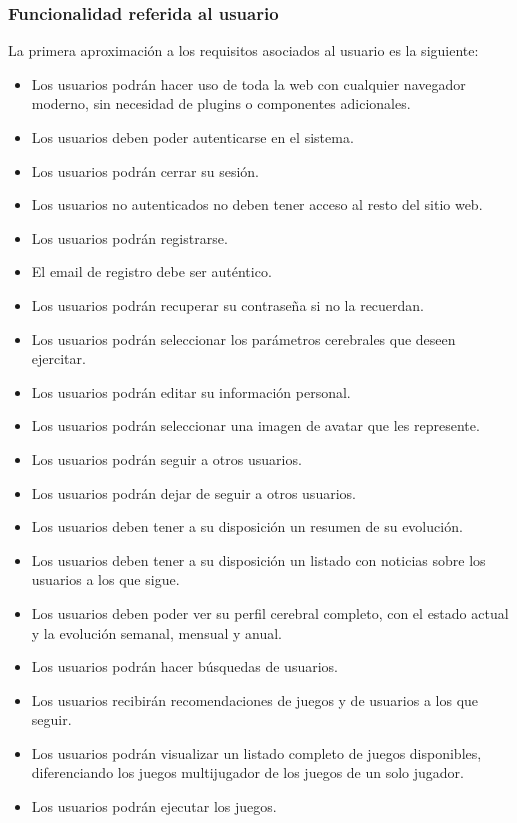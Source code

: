 \subsubsection{Funcionalidad referida al usuario}


La primera aproximación a los requisitos asociados al usuario es la siguiente:

\begin{itemize}
\item Los usuarios podrán hacer uso de toda la web con cualquier navegador moderno, sin necesidad de plugins o componentes adicionales.
\item Los usuarios deben poder autenticarse en el sistema.
\item Los usuarios podrán cerrar su sesión.
\item Los usuarios no autenticados no deben tener acceso al resto del sitio web.
\item Los usuarios podrán registrarse.
\item El email de registro debe ser auténtico.
\item Los usuarios podrán recuperar su contraseña si no la recuerdan.
\item Los usuarios podrán seleccionar los parámetros cerebrales que deseen ejercitar.
\item Los usuarios podrán editar su información personal.
\item Los usuarios podrán seleccionar una imagen de avatar que les represente.
\item Los usuarios podrán seguir a otros usuarios.
\item Los usuarios podrán dejar de seguir a otros usuarios.
\item Los usuarios deben tener a su disposición un resumen de su evolución.
\item Los usuarios deben tener a su disposición un listado con noticias sobre los usuarios a los que sigue.
\item Los usuarios deben poder ver su perfil cerebral completo, con el estado actual y la evolución semanal, mensual y anual.
\item Los usuarios podrán hacer búsquedas de usuarios.
\item Los usuarios recibirán recomendaciones de juegos y de usuarios a los que seguir.
\item Los usuarios podrán visualizar un listado completo de juegos disponibles, diferenciando los juegos multijugador de los juegos de un solo jugador.
\item Los usuarios podrán ejecutar los juegos.
\end{itemize}

